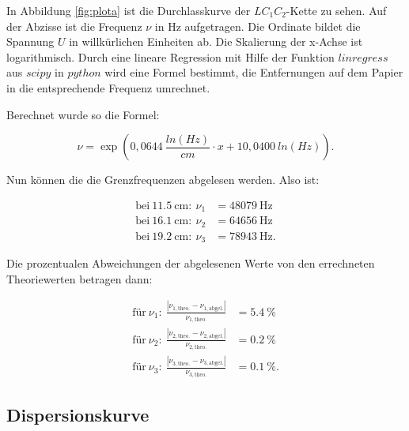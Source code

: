 \begin{figure*}[p]
  \centering
  \caption{Aufgenommene Durchlasskurve.}
  \label{fig:plota}
\end{figure*}

In Abbildung \ref{fig:plota} ist die Durchlasskurve der $LC_1C_2$-Kette zu
sehen. Auf der Abzisse ist die Frequenz $\nu$ in $\si{\hertz}$ aufgetragen. Die
Ordinate bildet die Spannung $U$ in willkürlichen Einheiten ab. Die Skalierung der x-Achse
 ist logarithmisch. Durch eine lineare
Regression mit Hilfe der Funktion $linregress$ aus $scipy$ \cite{scipy} in
$python$
wird eine Formel bestimmt, die Entfernungen auf dem Papier in die entsprechende
Frequenz umrechnet.

Berechnet wurde so die Formel:

\begin{equation}
  \nu = \exp(0,0644~\frac{ln(Hz)}{cm}\cdot x + 10,0400~ln(Hz)).
\end{equation}

Nun können die die Grenzfrequenzen abgelesen werden. Also ist:

\begin{align*}
  \text{bei}~\SI{11,5}{\centi\meter}:~\nu_1 &= \SI{48079}{\hertz}\\
  \text{bei}~\SI{16,1}{\centi\meter}:~\nu_2 &= \SI{64656}{\hertz}\\
  \text{bei}~\SI{19,2}{\centi\meter}:~\nu_3 &= \SI{78943}{\hertz}.
\end{align*}

Die prozentualen Abweichungen der abgelesenen Werte von den errechneten
Theoriewerten betragen dann:

\begin{align*}
  \text{für}~\nu_1:~\frac{|\nu_{1,\text{theo.}}-\nu_{1,\text{abgel.}}|}{\nu_{1,\text{theo.}}}&= \SI{5,4}{\percent}\\
  \text{für}~\nu_2:~\frac{|\nu_{2,\text{theo.}}-\nu_{2,\text{abgel.}}|}{\nu_{2,\text{theo.}}}&= \SI{0,2}{\percent}\\
  \text{für}~\nu_3:~\frac{|\nu_{3,\text{theo.}}-\nu_{3,\text{abgel.}}|}{\nu_{3,\text{theo.}}}&= \SI{0,1}{\percent}.
\end{align*}

\subsection{Dispersionskurve}


